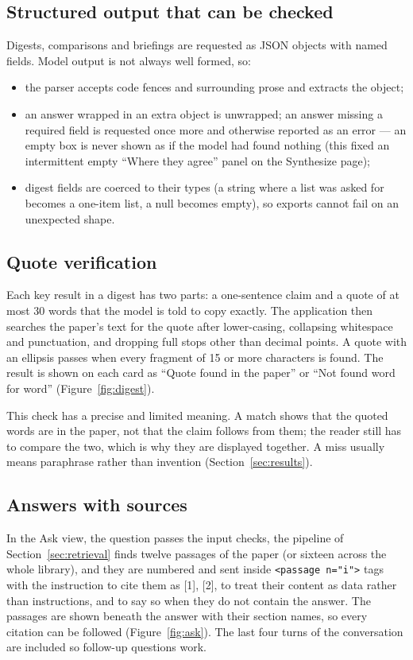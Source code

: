 \documentclass[11pt,a4paper]{article}
\newcommand{\code}[1]{\texttt{#1}}
\begin{document}
\subsection{Structured output that can be checked}
Digests, comparisons and briefings are requested as JSON objects with named fields. Model output is not
always well formed, so:
\begin{itemize}
\item the parser accepts code fences and surrounding prose and extracts the object;
\item an answer wrapped in an extra object is unwrapped; an answer missing a required field is requested
  once more and otherwise reported as an error --- an empty box is never shown as if the model had found
  nothing (this fixed an intermittent empty ``Where they agree'' panel on the Synthesize page);
\item digest fields are coerced to their types (a string where a list was asked for becomes a one-item list,
  a null becomes empty), so exports cannot fail on an unexpected shape.
\end{itemize}

\subsection{Quote verification}
Each key result in a digest has two parts: a one-sentence claim and a quote of at most 30 words that the
model is told to copy exactly. The application then searches the paper's text for the quote after
lower-casing, collapsing whitespace and punctuation, and dropping full stops other than decimal points. A
quote with an ellipsis passes when every fragment of 15 or more characters is found. The result is shown on
each card as ``Quote found in the paper'' or ``Not found word for word'' (Figure~\ref{fig:digest}).

This check has a precise and limited meaning. A match shows that the quoted words are in the paper, not that
the claim follows from them; the reader still has to compare the two, which is why they are displayed
together. A miss usually means paraphrase rather than invention (Section~\ref{sec:results}).

\subsection{Answers with sources}
In the Ask view, the question passes the input checks, the pipeline of Section~\ref{sec:retrieval} finds
twelve passages of the paper (or sixteen across the whole library), and they are numbered and sent inside
\code{<passage n="i">} tags with the instruction to cite them as [1], [2], to treat their content as data
rather than instructions, and to say so when they do not contain the answer. The passages are shown beneath the answer with their section names, so every
citation can be followed (Figure~\ref{fig:ask}). The last four turns of the conversation are included so
follow-up questions work.
\end{document}
